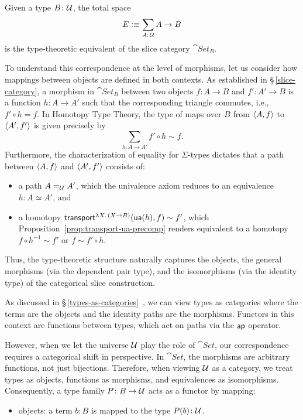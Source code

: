 \begin{rem}\ua
    Given a type $B\colon\univ$, the total space
    \[
        E\defeq\sum_{A\colon\univ}A\to B
    \]
    is the type-theoretic equivalent of the slice category $\cat{Set}_B$.
    
    To understand this correspondence at the level of morphisms, let us consider how mappings between objects are defined in both contexts. As established in \S\,\ref{slice-category}, a morphism in $\cat{Set}_B$ between two objects $f\colon A\to B$ and $f'\colon A'\to B$ is a function $h\colon A\to A'$ such that the corresponding triangle commutes, i.e., $f'\circ h=f$. In Homotopy Type Theory, the type of maps over $B$ from $\langle A,f\rangle$ to $\langle A',f'\rangle$ is given precisely by
    \[
        \sum_{h\colon A\to A'}f'\circ h\sim f.
    \]
    Furthermore, the characterization of equality for $\Sigma$-types dictates that a path between $\langle A,f\rangle$ and $\langle A',f'\rangle$ consists of:
    \begin{itemize}
        \item a path $A\mathrel{=_{\mathcal U}}A'$, which the univalence axiom reduces to an equivalence $h\colon A\simeq A'$, and
        
        \item a homotopy $\mathsf{transport}^{\lambda X.\,(X\to B)}(\mathsf{ua}(h),f)\sim f'$, which Proposition~\ref{prop:transport-ua-precomp} renders equivalent to a homotopy $f\circ h^{-1}\sim f'$ or $f\sim f'\circ h$.
    \end{itemize}
    Thus, the type-theoretic structure naturally captures the objects, the general morphisms (via the dependent pair type), and the isomorphisms (via the identity type) of the categorical slice construction.

    As discussed in \S\,\ref{types-as-categories}~, we can view types as categories where the terms are the objects and the identity paths are the morphisms. Functors in this context are functions between types, which act on paths via the $\mathsf{ap}$ operator.

    However, when we let the universe $\mathcal U$ play the role of $\cat{Set}$, our correspondence requires a categorical shift in perspective. In $\cat{Set}$, the morphisms are arbitrary functions, not just bijections. Therefore, when viewing $\mathcal U$ as a category, we treat types as objects, functions as morphisms, and equivalences as isomorphisms. Consequently, a type family $P\colon B\to\univ$ acts as a functor by mapping:
    \begin{itemize}
        \item objects: a term $b\colon B$ is mapped to the type $P(b)\colon\univ$.


\end{itemize}
\end{rem}
